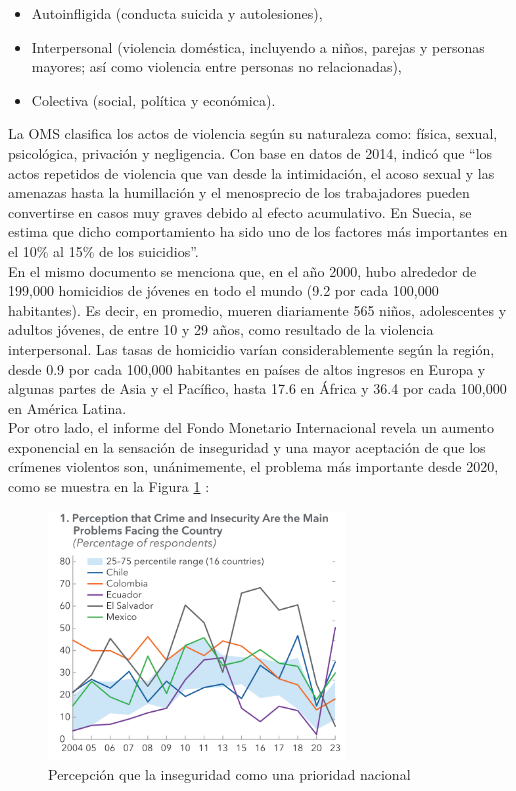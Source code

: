 \begin{itemize} 
    \item Autoinfligida (conducta suicida y autolesiones), 
    \item Interpersonal (violencia doméstica, incluyendo a niños, 
    parejas y personas mayores; así como violencia entre personas 
    no relacionadas), 
    \item Colectiva (social, política y económica). 
\end{itemize}

La OMS clasifica los actos de violencia según su naturaleza como: 
física, sexual, psicológica, privación y negligencia. 
Con base en datos de 2014, indicó que ``los actos 
repetidos de violencia que van desde la intimidación, el acoso 
sexual y las amenazas hasta la humillación y el menosprecio de 
los trabajadores pueden convertirse en casos muy graves debido 
al efecto acumulativo. En Suecia, se estima que dicho 
comportamiento ha sido uno de los factores más importantes en el 
10\% al 15\% de los suicidios''. \\

En el mismo documento se menciona que, en el año 2000, hubo 
alrededor de 199,000 homicidios de jóvenes en todo el mundo 
(9.2 por cada 100,000 habitantes). Es decir, en promedio, 
mueren diariamente 565 niños, adolescentes y adultos jóvenes, 
de entre 10 y 29 años, como resultado de la violencia 
interpersonal. Las tasas de homicidio varían considerablemente 
según la región, desde 0.9 por cada 100,000 habitantes en 
países de altos ingresos en Europa y algunas partes de Asia 
y el Pacífico, hasta 17.6 en África y 36.4 por cada 
100,000 en América Latina.\\

Por otro lado, el informe del Fondo Monetario Internacional 
revela un aumento exponencial en la sensación de inseguridad y 
una mayor aceptación de que los crímenes violentos son, 
unánimemente, el problema más importante desde 2020, como 
se muestra en la Figura \ref{fig:percepcion} \cite{Bisca2024}:\\

\begin{figure}[h!] 
    \centering
    \includegraphics[width=0.7\textwidth]{images/inseguridad2024.png} %
    \caption[Percepción que la inseguridad como una prioridad nacional]
    {Percepción que la inseguridad como una prioridad nacional \protect \cite{Bisca2024}}
    \label{fig:percepcion}
\end{figure}

